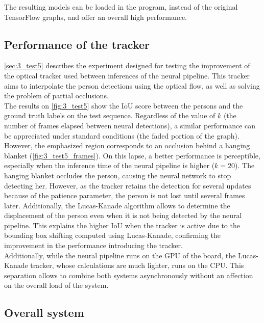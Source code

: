 The resulting models can be loaded in the program, instead of the original TensorFlow graphs, and offer an overall high performance.

\subsection{Performance of the tracker}

\autoref{sec:3_test5} describes the experiment designed for testing the improvement of the optical tracker used between inferences of the neural pipeline. This tracker aims to interpolate the person detections using the optical flow, as well as solving the problem of partial occlusions.\\

The results on \autoref{fig:3_test5} show the IoU score between the persons and the ground truth labels on the test sequence. Regardless of the value of $k$ (the number of frames elapsed between neural detections), a similar performance can be appreciated under standard conditions (the faded portion of the graph). However, the emphasized region corresponds to an occlusion behind a hanging blanket (\autoref{fig:3_test5_frames}). On this lapse, a better performance is perceptible, especially when the inference time of the neural pipeline is higher ($k=20$). The hanging blanket occludes the person, causing the neural network to stop detecting her. However, as the tracker retains the detection for several updates because of the patience parameter, the person is not lost until several frames later. Additionally, the Lucas-Kanade algorithm allows to determine the displacement of the person even when it is not being detected by the neural pipeline. This explains the higher IoU when the tracker is active due to the bounding box shifting computed using Lucas-Kanade, confirming the improvement in the performance introducing the tracker.\\

Additionally, while the neural pipeline runs on the GPU of the board, the Lucas-Kanade tracker, whose calculations are much lighter, runs on the CPU. This separation allows to combine both systems asynchronously without an affection on the overall load of the system.



\subsection{Overall system}

